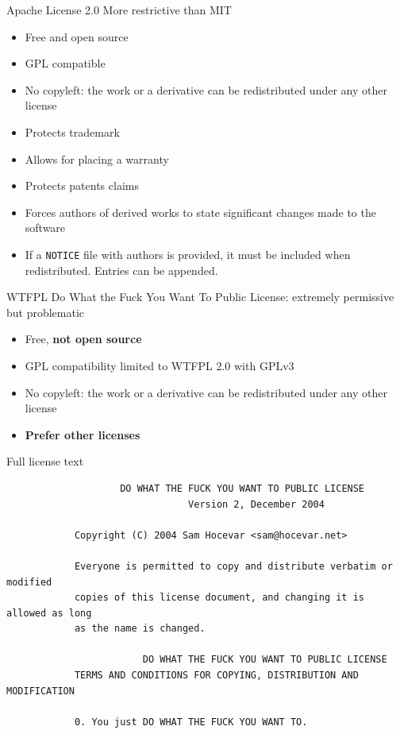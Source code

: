 \documentclass[presentation]{beamer}
\begin{document}
\begin{frame}{Apache License 2.0}
    More restrictive than MIT
    \begin{itemize}
        \item Free and open source
        \item GPL compatible
        \item No copyleft: the work or a derivative can be redistributed under any other license
        \item Protects trademark
        \item Allows for placing a warranty
        \item Protects patents claims
        \item Forces authors of derived works to state significant changes made to the software
        \item If a \texttt{NOTICE} file with authors is provided, it must be included when redistributed. Entries can be appended.
    \end{itemize}
\end{frame}

\begin{frame}[fragile]{WTFPL}
    Do What the Fuck You Want To Public License: extremely permissive but problematic
    \begin{itemize}
        \item Free, \textbf{not open source}
        \item GPL compatibility limited to WTFPL 2.0 with GPLv3
        \item No copyleft: the work or a derivative can be redistributed under any other license
        \item \textbf{Prefer other licenses}
    \end{itemize}
    \begin{block}{Full license text}
        \begin{verbatim}
                    DO WHAT THE FUCK YOU WANT TO PUBLIC LICENSE 
                                Version 2, December 2004 

            Copyright (C) 2004 Sam Hocevar <sam@hocevar.net> 

            Everyone is permitted to copy and distribute verbatim or modified 
            copies of this license document, and changing it is allowed as long 
            as the name is changed. 

                        DO WHAT THE FUCK YOU WANT TO PUBLIC LICENSE 
            TERMS AND CONDITIONS FOR COPYING, DISTRIBUTION AND MODIFICATION 

            0. You just DO WHAT THE FUCK YOU WANT TO.
        \end{verbatim}
    \end{block}

\end{frame}
\end{document}

